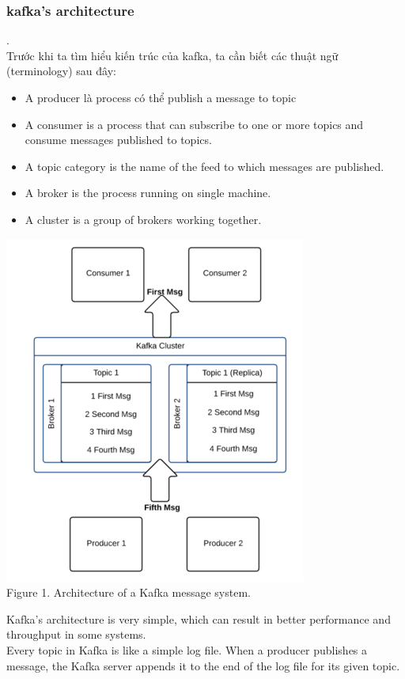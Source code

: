 \documentclass{hcmutarticle}
\begin{document}
\subsubsection{kafka's architecture}.\\
Trước khi ta tìm hiểu kiến trúc của kafka, ta cần biết các thuật
ngữ (terminology) sau đây:
\begin{itemize}
\item A producer là process có thể publish a message to topic
\item A consumer is a process that can subscribe to one or more
topics and consume messages published to topics.
\item A topic category is the name of the feed to which messages
are published.
\item A broker is the process running on single machine.
\item A cluster is a group of brokers working together.
\end{itemize}

\begin{center}
\includegraphics[scale=0.8]{image/kafka-architecture.png}\\[1cm]Figure 1. Architecture of a Kafka message system.
\end{center}

Kafka's architecture is very simple, which can result in better
performance and throughput in some systems.\\
Every topic in Kafka is like a simple log file. When a producer
publishes a message, the Kafka server appends it to the end of
the log file for its given topic.
\end{document}
